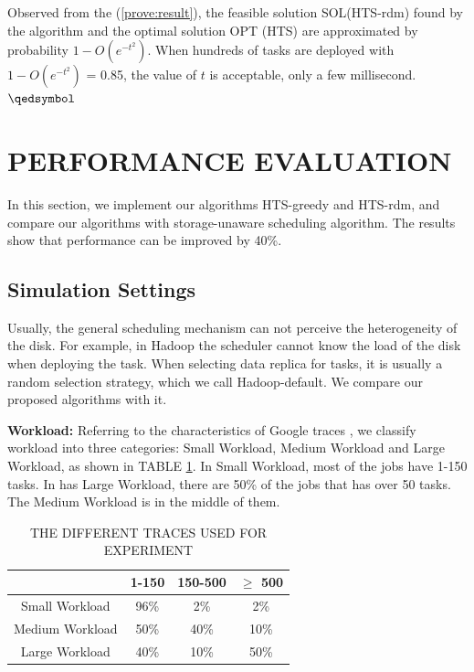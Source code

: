 \documentclass[conference]{IEEEtran}
\begin{document}
Observed from the (\ref{prove:result}), the feasible solution SOL(HTS-rdm) found by the algorithm and the optimal solution OPT (HTS) are approximated by probability $1 - O(e^{-t^2})$. When hundreds of tasks are deployed with $1 - O(e^{-t^2})$ = 0.85, the value of $t$ is acceptable, only a few millisecond.\hfill $\qedsymbol$


\section{PERFORMANCE EVALUATION}\label{PERFORMANCE_EVALUATION}

In this section, we implement our algorithms HTS-greedy and HTS-rdm, and compare our algorithms with storage-unaware scheduling algorithm. The results show that performance can be improved by 40\%.
\subsection{Simulation Settings}\label{SCM}
Usually, the general scheduling mechanism can not perceive the heterogeneity of the disk. For example, in Hadoop the scheduler cannot know the load of the disk when deploying the task. When selecting data replica for tasks, it is usually a random selection strategy, which we call Hadoop-default. We compare our proposed algorithms with it.

\textbf{Workload:} Referring to the characteristics of Google traces \cite{b20}, we classify workload into three categories: Small Workload, Medium Workload and Large Workload, as shown in TABLE \ref{tab:workload}. In Small Workload, most of the jobs have 1-150 tasks. In has Large Workload, there are 50\% of the jobs that has over 50 tasks. The Medium Workload is in the middle of them.

\begin{table}[htbp]
	\caption{THE DIFFERENT TRACES USED FOR EXPERIMENT}
	\begin{center}
		\begin{tabular}{|c|c|c|c|}
			\hline
			 \diagbox{Traces}{Number of tasks} & 1-150 & 150-500 & $\ge$ 500\\
			\hline
			Small Workload & 96\% & 2\% & 2\%\\
			\hline
			Medium Workload & 50\% & 40\% & 10\%\\
			\hline
			Large Workload & 40\% & 10\% & 50\%\\
			\hline
		\end{tabular}
		\label{tab:workload}
	\end{center}
\end{table}
\end{document}
